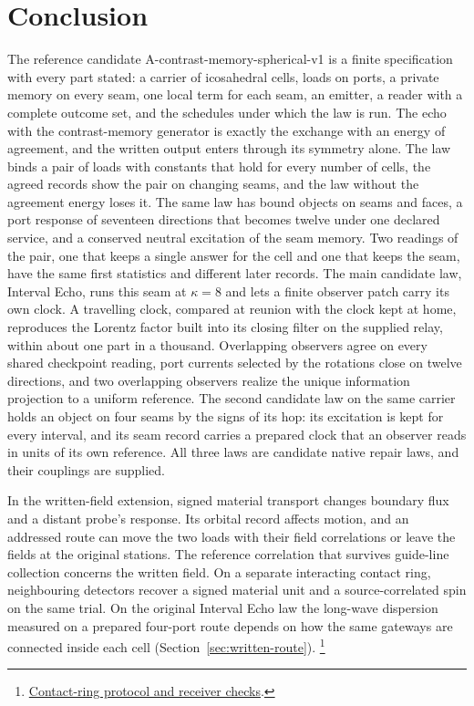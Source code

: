 \documentclass[11pt]{article}
\theoremstyle{definition}
\theoremstyle{remark}
\theoremstyle{plain}
\begin{document}
\section{Conclusion}
\label{sec:conclusion}

The reference candidate A-contrast-memory-spherical-v1 is a finite
specification with every part stated: a carrier of icosahedral cells,
loads on ports, a private memory
on every seam, one local term for each seam, an emitter, a reader with a
complete outcome set, and the schedules under which the law is run. The
echo with the contrast-memory generator is exactly the exchange with an
energy of agreement, and the written output enters through its symmetry
alone. The law binds a pair of loads with constants that hold for every
number of cells, the agreed records show the pair on changing seams, and
the law without the agreement energy loses it. The same law has bound
objects on seams and faces, a port response of seventeen directions that
becomes twelve under one declared service, and a conserved neutral
excitation of the seam memory. Two readings of the pair, one that keeps a
single answer for the cell and one that keeps the seam, have the same first
statistics and different later records. The main candidate law, Interval
Echo, runs this seam at $\kappa=8$ and lets a finite observer patch carry
its own clock. A travelling clock, compared at reunion with the clock kept
at home, reproduces the Lorentz factor built into its closing filter on the supplied relay, within about one part in a thousand. Overlapping observers
agree on every shared checkpoint reading, port currents selected by the
rotations close on twelve directions, and two overlapping observers realize
the unique information projection to a uniform reference. The second
candidate law on the same carrier holds an object on four seams by the
signs of its hop: its excitation is kept for every interval, and its seam
record carries a prepared clock that an observer reads in units of its own
reference. All three laws are candidate native repair laws, and their
couplings are supplied.

In the written-field extension, signed material transport changes
boundary flux and a distant probe's response. Its orbital record affects
motion, and an addressed route can move the two loads with their field
correlations or leave the fields at the original stations. The
reference correlation that survives guide-line collection concerns the
written field. On a separate interacting contact ring, neighbouring
detectors recover a signed material unit and a source-correlated spin
on the same trial. On the original
Interval Echo law the long-wave dispersion measured on a prepared
four-port route depends on how the same gateways are connected inside
each cell (Section~\ref{sec:written-route}).%
\footnote{\href{https://github.com/FloatingPragma/observer-patch-holography/tree/main/model/candidate_laws/interval_echo/openwave/electron_field/lepton_family/theorem_interfaces/interacting_chain}{Contact-ring protocol and receiver checks}.}
\end{document}

